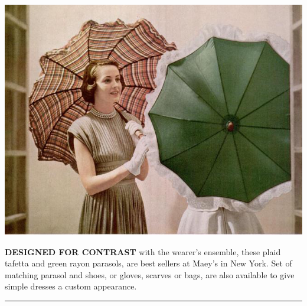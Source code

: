\vspace*{-1cm}
\begin{minipage}{1.05\textwidth}
\hskip-0.9cm\includegraphics[width=1.03\textwidth]{./images/parasol-05.jpg}\\[-27.5pt]
\setlength{\linewidth}{0.95\textwidth}
\setlength{\columnsep}{10pt}
\begin{multicols}{2}
\noindent \footnotesize\textbf{DESIGNED FOR CONTRAST} with the wearer's ensemble, these plaid  tafetta and green rayon parasols, are best sellers at Maey's in New York. Set of matching parasol and shoes, or
gloves, scarves or bags, are also available to give simple dresses
a custom appearance.
\end{multicols}
\vspace{-0.25cm}
\rule{1.5cm}{0pt}
\end{minipage}
